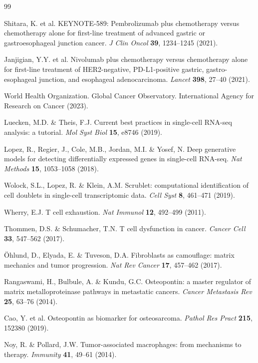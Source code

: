 \documentclass[12pt,twoside]{article}
\begin{document}
\begin{thebibliography}{99}

 Shitara, K. et al. KEYNOTE-589: Pembrolizumab plus chemotherapy versus chemotherapy alone for first-line treatment of advanced gastric or gastroesophageal junction cancer. \textit{J Clin Oncol} \textbf{39}, 1234--1245 (2021).

 Janjigian, Y.Y. et al. Nivolumab plus chemotherapy versus chemotherapy alone for first-line treatment of HER2-negative, PD-L1-positive gastric, gastro-esophageal junction, and esophageal adenocarcinoma. \textit{Lancet} \textbf{398}, 27--40 (2021).

 World Health Organization. Global Cancer Observatory. International Agency for Research on Cancer (2023).

 Luecken, M.D. \& Theis, F.J. Current best practices in single-cell RNA-seq analysis: a tutorial. \textit{Mol Syst Biol} \textbf{15}, e8746 (2019).

 Lopez, R., Regier, J., Cole, M.B., Jordan, M.I. \& Yosef, N. Deep generative models for detecting differentially expressed genes in single-cell RNA-seq. \textit{Nat Methods} \textbf{15}, 1053--1058 (2018).

 Wolock, S.L., Lopez, R. \& Klein, A.M. Scrublet: computational identification of cell doublets in single-cell transcriptomic data. \textit{Cell Syst} \textbf{8}, 461--471 (2019).

 Wherry, E.J. T cell exhaustion. \textit{Nat Immunol} \textbf{12}, 492--499 (2011).

 Thommen, D.S. \& Schumacher, T.N. T cell dysfunction in cancer. \textit{Cancer Cell} \textbf{33}, 547--562 (2017).

 Öhlund, D., Elyada, E. \& Tuveson, D.A. Fibroblasts as camouflage: matrix mechanics and tumor progression. \textit{Nat Rev Cancer} \textbf{17}, 457--462 (2017).

 Rangaswami, H., Bulbule, A. \& Kundu, G.C. Osteopontin: a master regulator of matrix metalloproteinase pathways in metastatic cancers. \textit{Cancer Metastasis Rev} \textbf{25}, 63--76 (2014).

 Cao, Y. et al. Osteopontin as biomarker for osteosarcoma. \textit{Pathol Res Pract} \textbf{215}, 152380 (2019).

 Noy, R. \& Pollard, J.W. Tumor-associated macrophages: from mechanisms to therapy. \textit{Immunity} \textbf{41}, 49--61 (2014).


\end{thebibliography}
\end{document}
